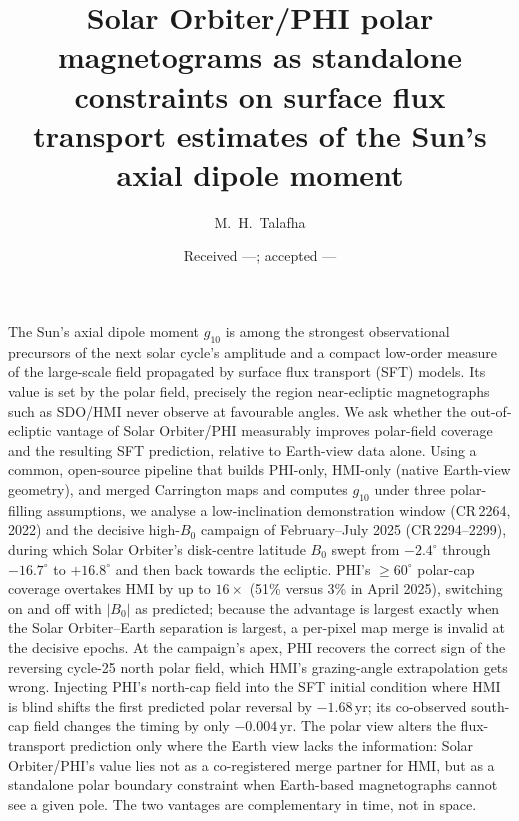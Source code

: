 \documentclass{aa}
\begin{document}
\title{Solar Orbiter/PHI polar magnetograms as standalone constraints on surface flux transport estimates of the Sun's axial dipole moment}

\author{M.~H.~Talafha}


\date{Received ---; accepted ---}

\abstract
{The Sun's axial dipole moment $g_{10}$ is among the strongest observational precursors of the next solar cycle's amplitude and a compact low-order measure of the large-scale field propagated by surface flux transport (SFT) models. Its value is set by the polar field, precisely the region near-ecliptic magnetographs such as SDO/HMI never observe at favourable angles.}
{We ask whether the out-of-ecliptic vantage of Solar Orbiter/PHI measurably improves polar-field coverage and the resulting SFT prediction, relative to Earth-view data alone.}
{Using a common, open-source pipeline that builds PHI-only, HMI-only (native Earth-view geometry), and merged Carrington maps and computes $g_{10}$ under three polar-filling assumptions, we analyse a low-inclination demonstration window (CR\,2264, 2022) and the decisive high-$B_0$ campaign of February--July 2025 (CR\,2294--2299), during which Solar Orbiter's disk-centre latitude $B_0$ swept from $-2.4^{\circ}$ through $-16.7^{\circ}$ to $+16.8^{\circ}$ and then back towards the ecliptic.}
{PHI's $\ge 60^{\circ}$ polar-cap coverage overtakes HMI by up to $16\times$ (51\% versus 3\% in April 2025), switching on and off with $|B_0|$ as predicted; because the advantage is largest exactly when the Solar Orbiter--Earth separation is largest, a per-pixel map merge is invalid at the decisive epochs. At the campaign's apex, PHI recovers the correct sign of the reversing cycle-25 north polar field, which HMI's grazing-angle extrapolation gets wrong. Injecting PHI's north-cap field into the SFT initial condition where HMI is blind shifts the first predicted polar reversal by $-1.68$\,yr; its co-observed south-cap field changes the timing by only $-0.004$\,yr.}
{The polar view alters the flux-transport prediction only where the Earth view lacks the information: Solar Orbiter/PHI's value lies not as a co-registered merge partner for HMI, but as a standalone polar boundary constraint when Earth-based magnetographs cannot see a given pole. The two vantages are complementary in time, not in space.}
\end{document}
